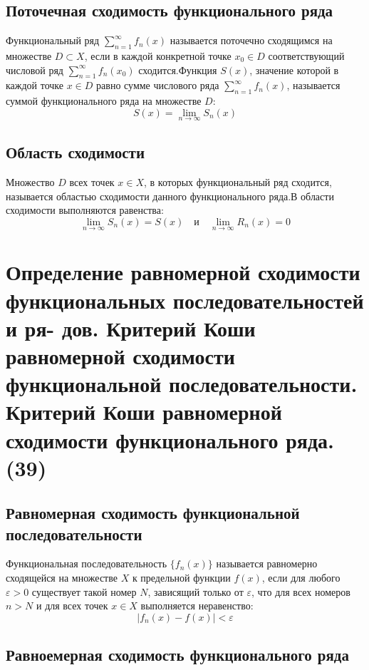 \documentclass[14pt]{extreport}
\begin{document}
    \section{Поточечная сходимость функционального ряда}
    \begin{definition}
        Функциональный ряд $\sum_{n=1}^{\infty} f_n(x)$ называется поточечно сходящимся на множестве $D \subset X$, если в каждой конкретной точке $x_0 \in D$ соответствующий числовой ряд $\sum_{n=1}^{\infty} f_n(x_0)$ сходится.Функция $S(x)$, значение которой в каждой точке $x \in D$ равно сумме числового ряда $\sum_{n=1}^{\infty} f_n(x)$, называется суммой функционального ряда на множестве $D$:$$S(x) = \lim_{n \to \infty} S_n(x)$$
    \end{definition}

    \section{Область сходимости}
    Множество $D$ всех точек $x \in X$, в которых функциональный ряд сходится, называется областью сходимости данного функционального ряда.В области сходимости выполняются равенства:$$\lim_{n \to \infty} S_n(x) = S(x) \quad \text{и} \quad \lim_{n \to \infty} R_n(x) = 0$$


    \chapter{Определение равномерной сходимости функциональных последовательностей и ря-
дов. Критерий Коши равномерной сходимости функциональной последовательности.
Критерий Коши равномерной сходимости функционального ряда. (39)}

    \section{Равномерная сходимость функциональной последовательности}
    \begin{definition}
        Функциональная последовательность $\{f_n(x)\}$ называется равномерно сходящейся на множестве $X$ к предельной функции $f(x)$, если для любого $\varepsilon > 0$ существует такой номер $N$, зависящий только от $\varepsilon$, что для всех номеров $n > N$ и для всех точек $x \in X$ выполняется неравенство:$$|f_n(x) - f(x)| < \varepsilon$$
    \end{definition}

    \section{Равноемерная сходимость функционального ряда}
\end{document}
